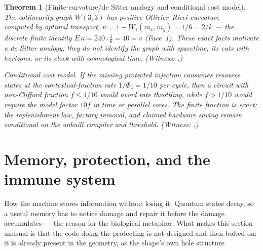 \documentclass[11pt]{article}
\newtheorem{theorem}{Theorem}[section]
\newcommand{\W}{W(3,3)}
\begin{document}
\begin{theorem}[Finite-curvature/de Sitter analogy and conditional cost model]
The collinearity graph $\W$ has positive Ollivier--Ricci curvature ---
computed by optimal transport, $\kappa=1-W_1(m_x,m_y)=1/6=2/k$ --- the discrete
finite identity $E\,\kappa=240\cdot\tfrac16=40=v$ (Face~1). These exact
facts motivate a de Sitter analogy; they do not identify the graph with
spacetime, its cuts with horizons, or its clock with cosmological time.
(Witness:
.)

\emph{Conditional cost model.} If the missing protected injection consumes
resource states at the contextual-fraction rate $1/\Phi_4=1/10$ per cycle,
then a circuit with non-Clifford fraction $f\le1/10$ would avoid rate
throttling, while $f>1/10$ would require the model factor $10f$ in time or
parallel cores.  The finite fraction is exact; the replenishment law, factory
removal, and claimed hardware saving remain conditional on the unbuilt
compiler and threshold. (Witness: .)
\end{theorem}

\section{Memory, protection, and the immune system}

\begin{plainbox}
How the machine stores information without losing it. Quantum states decay, so a
useful memory has to notice damage and repair it before the damage accumulates --- the
reason for the biological metaphor. What makes this section unusual is that the code doing
the protecting is not designed and then bolted on: it is already present in the geometry,
as the shape's own hole structure.
\end{plainbox}

\label{sec:memory}
\end{document}
